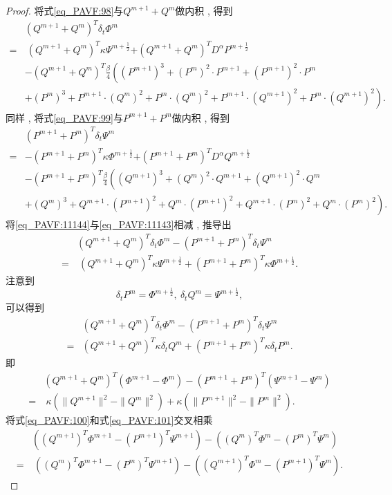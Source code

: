 \begin{proof}
将式\eqref{eq_PAVF:98}与$Q^{m+1}+Q^{m}$做内积 , 得到
\begin{align}
&(Q^{m+1}+Q^{m})^{T}\delta_{t} \varPhi^{m}\nonumber\\
=&~(Q^{m+1}+Q^{m})^{T}\kappa \Psi^{m+\frac{1}{2}}{+(Q^{m+1}+Q^{m})^{T}D^{\alpha} P^{m+\frac{1}{2}}}\nonumber\\
&-(Q^{m+1}+Q^{m})^{T}\frac{\beta}{4}\left((P^{m+1})^3+(P^{m})^{2}\cdot P^{m+1}+(P^{m+1})^{2}\cdot P^{m}\right . \nonumber\\
&\left . +(P^{m})^{3}+P^{m+1}\cdot (Q^{m})^{2}+P^{m}\cdot (Q^{m})^{2}+P^{m+1}\cdot (Q^{m+1})^{2}+P^{m}\cdot (Q^{m+1})^{2}\right) . \label{eq_PAVF:11143}
\end{align}
同样 , 将式\eqref{eq_PAVF:99}与$P^{m+1}+P^{m}$做内积 , 得到
\begin{align}
&(P^{m+1}+P^{m})^{T}\delta_{t} \Psi^{m}\nonumber\\
=&-(P^{m+1}+P^{m})^{T}\kappa \varPhi^{m+\frac{1}{2}}{+(P^{m+1}+P^{m})^{T}D^{\alpha} Q^{m+\frac{1}{2}}}\nonumber\\
&-(P^{m+1}+P^{m})^{T}\frac{\beta}{4}\left((Q^{m+1})^3+(Q^{m})^{2}\cdot Q^{m+1}+(Q^{m+1})^{2}\cdot Q^{m}\right . \nonumber\\
&\left . +(Q^{m})^{3}+Q^{m+1}\cdot (P^{m+1})^{2}+Q^{m}\cdot (P^{m+1})^{2}+Q^{m+1}\cdot (P^{m})^{2}+Q^{m}\cdot (P^{m})^{2}\right) . \label{eq_PAVF:11144}
\end{align}
将\eqref{eq_PAVF:11144}与\eqref{eq_PAVF:11143}相减 , 推导出
\begin{align}
&(Q^{m+1}+Q^{m})^{T}\delta_{t} \varPhi^{m}-(P^{m+1}+P^{m})^{T}\delta_{t} \Psi^{m}\nonumber\\
=&~(Q^{m+1}+Q^{m})^{T}\kappa \Psi^{m+\frac{1}{2}}+(P^{m+1}+P^{m})^{T}\kappa \varPhi^{m+\frac{1}{2}} . \label{eq_PAVF:11145}
\end{align}
注意到
$$\delta_t P^m=\varPhi^{m+\frac{1}{2}} , ~\delta_t Q^m=\Psi^{m+\frac{1}{2}} , $$
可以得到
\begin{align}\label{eq_PAVF:11146}
&(Q^{m+1}+Q^{m})^{T}\delta_{t} \varPhi^{m}\!-\!(P^{m+1}+P^{m})^{T}\delta_{t} \Psi^{m}\nonumber\\
=&(Q^{m+1}+Q^{m})^{T}\kappa \delta_t Q^m+(P^{m+1}+P^{m})^{T}\kappa \delta_t P^m . 
\end{align}
即
\begin{align}
&(Q^{m+1}+Q^{m})^{T}(\varPhi^{m+1}-\varPhi^{m})-(P^{m+1}+P^{m})^{T}(\Psi^{m+1}-\Psi^{m})\nonumber\\
=&~\kappa (\|Q^{m+1}\|^2-\|Q^{m}\|^2)+\kappa (\|P^{m+1}\|^2-\|P^{m}\|^2) . \label{eq_PAVF:11147}
\end{align}
将式\eqref{eq_PAVF:100}和式\eqref{eq_PAVF:101}交叉相乘
\begin{align}\label{eq_PAVF:11221}
&((Q^{m+1})^{T}\varPhi^{m+1}-(P^{m+1})^{T}\Psi^{m+1})-((Q^{m})^{T}\varPhi^{m}-(P^{m})^{T}\Psi^{m})\nonumber\\
=&~((Q^{m})^{T}\varPhi^{m+1}-(P^{m})^{T}\Psi^{m+1})-((Q^{m+1})^{T}\varPhi^{m}-(P^{m+1})^{T}\Psi^{m}) . 
\end{align}


\end{proof}
